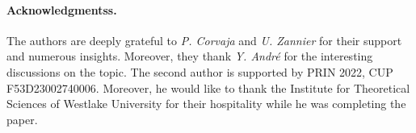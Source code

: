 \documentclass[10 pt,a4paper]{article}
\theoremstyle{plain}
\theoremstyle{definition}
\theoremstyle{named}
\begin{document}

\paragraph{Acknowledgmentss.} 
The authors are deeply grateful to \emph{P. Corvaja} and \emph{U. Zannier} for their support and numerous insights. Moreover, they thank \emph{Y. Andr\'e} for the interesting discussions on the topic.
The second author is supported by PRIN 2022, CUP F53D23002740006. Moreover, he would like to thank the Institute for Theoretical Sciences of Westlake University for their hospitality while he was completing the paper.
\end{document}
